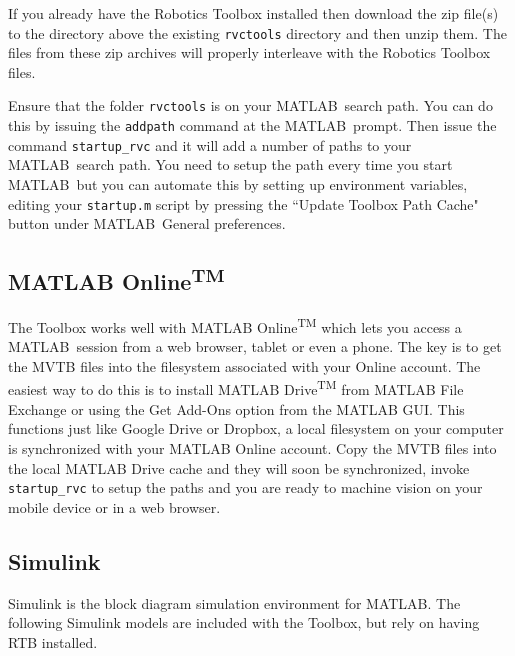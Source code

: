 \documentclass[a4paper,twoside]{report}
\def\Mlab{MATLAB}
\begin{document}
If you already have the Robotics Toolbox installed then download
the zip file(s) to the directory above the existing \texttt{rvctools} directory
and then unzip them.
The files from these zip archives will properly interleave with the Robotics
Toolbox files.

Ensure that the folder \texttt{rvctools} is on your \Mlab\ search
path.  You can do this by issuing the \texttt{addpath} command at 
the \Mlab\ prompt.
Then issue the command \texttt{startup\_rvc} and it will add a number
of paths to your \Mlab\ search path.
You need to setup the path every time you start \Mlab\ but you can 
automate this by setting up environment variables, editing your 
\texttt{startup.m} script by pressing the ``Update Toolbox Path
Cache" button under \Mlab\ General preferences.

\subsection{MATLAB Online\textsuperscript{TM}}
The Toolbox works well with MATLAB Online\textsuperscript{TM} which lets you access a \Mlab\ session from a web browser, tablet 
or even a phone.
The key is to get the MVTB files into the filesystem associated with your Online account.  The easiest way to do this is to install
MATLAB Drive\textsuperscript{TM} from MATLAB File Exchange or using the Get Add-Ons option from the MATLAB GUI.  This functions
just like Google Drive or Dropbox, a local filesystem on your computer is synchronized with your MATLAB Online account.  Copy the MVTB
files into the local MATLAB Drive cache and they will soon be synchronized, invoke \texttt{startup\_rvc} to setup the paths and you are ready to machine vision on your mobile device or in a web browser.

\subsection{Simulink\textsuperscript{\textregistered}}
Simulink\textsuperscript{\textregistered} is the block diagram simulation environment for MATLAB.
The following Simulink models are included with the Toolbox, but rely on having RTB installed.
\end{document}
